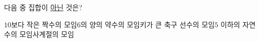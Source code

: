 다음 중 집합이 \underline{아닌} 것은?
\begin{choicesv}{$10$보다 작은 짝수의 모임}{$6$의 양의 약수의 모임}{키가 큰 축구 선수의 모임}{$5$ 이하의 자연수의 모임}{사계절의 모임}\end{choicesv}
